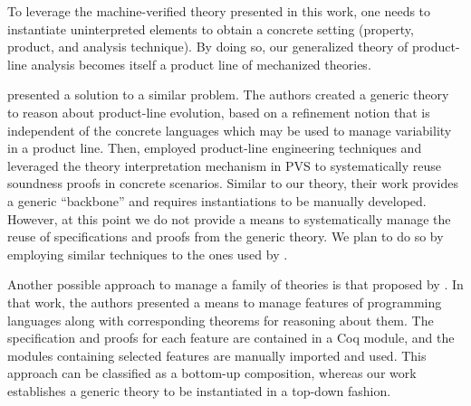 To leverage the machine-verified theory presented in
this work, one needs to instantiate uninterpreted
elements to obtain a concrete setting (property,
product, and analysis technique).
By doing so, our generalized theory of product-line
analysis becomes itself a product line of mechanized
theories.

\citet{Teixeira2015} presented a solution to a similar problem.
The authors created a generic theory to reason about product-line evolution,
based on a refinement notion that is independent of the concrete languages which
may be used to manage variability in a product line.
Then, \citet{Teixeira2015} employed product-line engineering techniques and
leveraged the theory interpretation mechanism in PVS to systematically reuse
soundness proofs in concrete scenarios.
Similar to our theory, their work provides a generic ``backbone'' and requires
instantiations to be manually developed.
However, at this point we do not provide a means to systematically manage the reuse
of specifications and proofs from the generic theory.
We plan to do so by employing similar techniques to the ones used by \citet{Teixeira2015}.

Another possible approach to manage a family of theories is that proposed by
\citet{DelawareTheoremPL}.
In that work, the authors presented a means to manage features of programming languages
along with corresponding theorems for reasoning about them.
The specification and proofs for each feature are contained in a Coq module, and the modules
containing selected features are manually imported and used.
This approach can be classified as a bottom-up composition, whereas our work
establishes a generic theory to be instantiated in a top-down fashion.